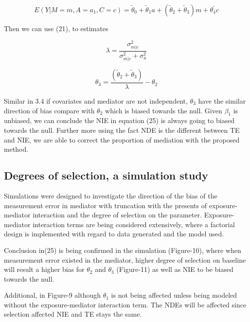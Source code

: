 \documentclass{article}
\begin{document}
\begin{equation}
E (Y |M = m,A = a_1,C = c) = \tilde \theta_0+\tilde \theta_1 a+ (\tilde \theta_2 + \tilde \theta_3) m + \theta_4^{'} c
\end{equation}


Then we can use (21), to estimates

\begin{equation}
 \lambda = \frac{\sigma_{m|c}^2}{\sigma_{m|c}^2 + \sigma_{u}^2}
\end{equation}



\begin{equation}
\theta_3 = \frac{(\tilde \theta_2 + \tilde \theta_3)}{\lambda} - \theta_2
\end{equation}


Similar in 3.4 if covariates and mediator are not independent, $\theta_3$ have the similar direction of bias compare with $\theta_2$ which is biased towards the null. Given $\beta_1$ is unbiased, we can conclude the NIE in equation (25) is always going to biased towards the null. Further more using the fact NDE is the different between TE and NIE, we are able to correct the proportion of mediation with the proposed method. 

\subsection{Degrees of selection, a simulation study }

Simulations were designed to investigate the direction of the bias of the measurement error in mediator with truncation with the presents of exposure-mediator interaction and the degree of selection on the parameter. Exposure-mediator interaction terms are being considered extensively, where a factorial design is implemented with regard to data generated and the model used. 

Conclusion in(25) is being confirmed in the simulation (Figure-10), where when measurement error existed in the mediator, higher degree of selection on baseline will result a higher bias for $\theta_2$ and $\theta_3$ (Figure-11) as well as NIE to be biased towards the null.

Additional, in Figure-9 although $\theta_1$ is not being affected unless being modeled without the exposure-mediator interaction term. The NDEs will be affected since selection affected NIE and TE stays the same.
\end{document}
